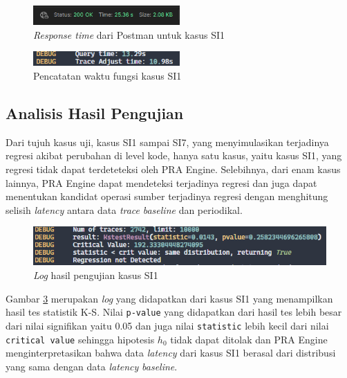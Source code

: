 \begin{figure}[!htb]
	\centering
	\includegraphics[width=0.5\textwidth]{resources/ch4/time/1-postman.png}
	\caption{\textit{Response time} dari Postman untuk kasus SI1}
	\label{time_p_1}
\end{figure}

\begin{figure}[!htb]
	\centering
	\includegraphics[width=0.5\textwidth]{resources/ch4/time/1-log.png}
	\caption{Pencatatan waktu fungsi kasus SI1}
	\label{time_l_1}
\end{figure}



\subsection{Analisis Hasil Pengujian}
Dari tujuh kasus uji, kasus SI1 sampai SI7, yang menyimulasikan terjadinya regresi akibat perubahan di level kode, hanya satu kasus, yaitu kasus SI1, yang regresi tidak dapat terdeteteksi oleh PRA Engine. Selebihnya, dari enam kasus lainnya, PRA Engine dapat mendeteksi terjadinya regresi dan juga dapat menentukan kandidat operasi sumber terjadinya regresi dengan menghitung selisih \textit{latency} antara data \textit{trace} \textit{baseline} dan periodikal. 

\begin{figure}[!htb]
	\centering
	\includegraphics[width=1\textwidth]{resources/ch4/log/1-log.png}
	\caption{\textit{Log} hasil pengujian kasus SI1}
	\label{result_log_1}
\end{figure}

Gambar \ref{result_log_1} merupakan \textit{log} yang didapatkan dari kasus SI1 yang menampilkan hasil tes statistik K-S. Nilai \texttt{p-value} yang didapatkan dari hasil tes lebih besar dari nilai signifikan yaitu 0.05 dan juga nilai \texttt{statistic} lebih kecil dari nilai \texttt{critical value} sehingga hipotesis $h_{0}$ tidak dapat ditolak dan PRA Engine menginterpretasikan bahwa data \textit{latency} dari kasus SI1 berasal dari distribusi yang sama dengan data \textit{latency} \textit{baseline}. 

